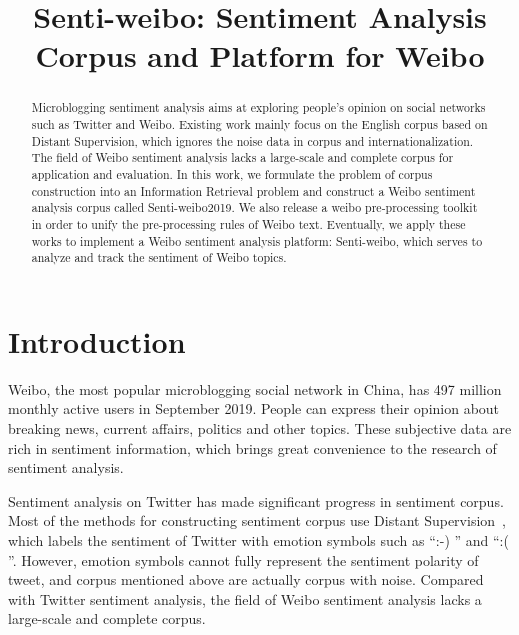 \documentclass[runningheads]{llncs}
\begin{document}
%
\title{Senti-weibo: Sentiment Analysis Corpus and Platform for Weibo}
%
%
\maketitle              %
%
\begin{abstract}
Microblogging sentiment analysis aims at exploring people's opinion on social networks such as Twitter and Weibo. Existing work mainly focus on the English corpus based on Distant Supervision, which ignores the noise data in corpus and internationalization. The field of Weibo sentiment analysis lacks a large-scale and complete corpus for application and evaluation. In this work, we formulate the problem of corpus construction into an Information Retrieval problem and construct a Weibo sentiment analysis corpus called Senti-weibo2019. We also release a weibo pre-processing toolkit in order to unify the pre-processing rules of Weibo text. Eventually, we apply these works to implement a Weibo sentiment analysis platform: Senti-weibo, which serves to analyze and track the sentiment of Weibo topics.


\end{abstract}

\section{Introduction}
Weibo, the most popular microblogging social network in China, has 497 million monthly active users in September 2019. People can express their opinion about breaking news, current affairs, politics and other topics. These subjective data are rich in sentiment information, which brings great convenience to the research of sentiment analysis.

Sentiment analysis on Twitter has made significant progress in sentiment corpus. Most of the methods for constructing sentiment corpus use Distant Supervision~\cite{go2009twitter}, which labels the sentiment of Twitter with emotion symbols such as ``:-) '' and ``:( ''. However, emotion symbols cannot fully represent the sentiment polarity of tweet, and corpus mentioned above are actually corpus with noise. Compared with Twitter sentiment analysis, the field of Weibo sentiment analysis lacks a large-scale and complete corpus.
\end{document}
